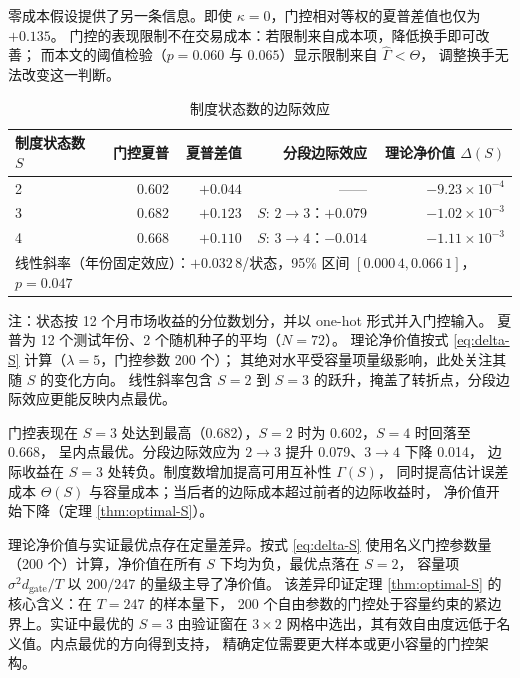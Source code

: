 零成本假设提供了另一条信息。即使 $\kappa=0$，门控相对等权的夏普差值也仅为 $+0.135$。
门控的表现限制不在交易成本：若限制来自成本项，降低换手即可改善；
而本文的阈值检验（$p=0.060$ 与 $0.065$）显示限制来自 $\hat\Gamma<\Theta$，
调整换手无法改变这一判断。

\begin{table}[htbp]
\centering
\caption{制度状态数的边际效应}
\label{tab:states}
\begin{threeparttable}
\footnotesize
\begin{tabular}{lrrrr}
\toprule
制度状态数 $S$ & 门控夏普 & 夏普差值 & 分段边际效应 & 理论净价值 $\Delta(S)$ \\
\midrule
2 & 0.602 & $+0.044$ & —— & $-9.23\times10^{-4}$ \\
3 & 0.682 & $+0.123$ & $S{:}\,2\to3$：$+0.079$ & $-1.02\times10^{-3}$ \\
4 & 0.668 & $+0.110$ & $S{:}\,3\to4$：$-0.014$ & $-1.11\times10^{-3}$ \\
\midrule
\multicolumn{5}{l}{线性斜率（年份固定效应）：$+0.032\,8$/状态，95\% 区间
$[0.000\,4,0.066\,1]$，$p=0.047$} \\
\bottomrule
\end{tabular}
\begin{tablenotes}[flushleft]\footnotesize
\item 注：状态按 12 个月市场收益的分位数划分，并以 one-hot 形式并入门控输入。
夏普为 12 个测试年份、2 个随机种子的平均（$N=72$）。
理论净价值按式 \eqref{eq:delta-S} 计算（$\lambda=5$，门控参数 200 个）；
其绝对水平受容量项量级影响，此处关注其随 $S$ 的变化方向。
线性斜率包含 $S=2$ 到 $S=3$ 的跃升，掩盖了转折点，分段边际效应更能反映内点最优。
\end{tablenotes}
\end{threeparttable}
\end{table}

门控表现在 $S=3$ 处达到最高（0.682），$S=2$ 时为 0.602，$S=4$ 时回落至 0.668，
呈内点最优。分段边际效应为 $2\to3$ 提升 0.079、$3\to4$ 下降 0.014，
边际收益在 $S=3$ 处转负。制度数增加提高可用互补性 $\Gamma(S)$，
同时提高估计误差成本 $\Theta(S)$ 与容量成本；当后者的边际成本超过前者的边际收益时，
净价值开始下降（定理 \ref{thm:optimal-S}）。

理论净价值与实证最优点存在定量差异。按式 \eqref{eq:delta-S} 使用名义门控参数量
（200 个）计算，净价值在所有 $S$ 下均为负，最优点落在 $S=2$，
容量项 $\sigma^2d_{\text{gate}}/T$ 以 $200/247$ 的量级主导了净价值。
该差异印证定理 \ref{thm:optimal-S} 的核心含义：在 $T=247$ 的样本量下，
200 个自由参数的门控处于容量约束的紧边界上。实证中最优的 $S=3$ 由验证窗在
$3\times2$ 网格中选出，其有效自由度远低于名义值。内点最优的方向得到支持，
精确定位需要更大样本或更小容量的门控架构。

